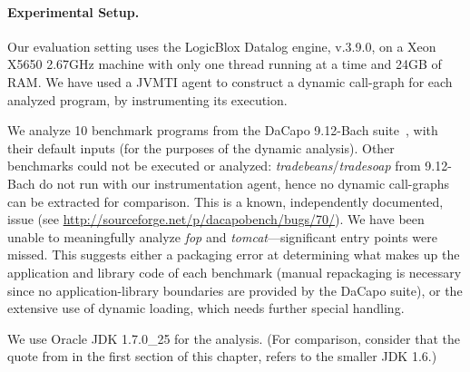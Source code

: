 \paragraph{Experimental Setup.}
Our evaluation setting uses the LogicBlox Datalog engine, v.3.9.0, on
a Xeon X5650 2.67GHz machine with only one thread running at a time
and 24GB of RAM. We have used a JVMTI agent to construct a dynamic
call-graph for each analyzed program, by instrumenting its execution.

We analyze 10 benchmark programs from the DaCapo 9.12-Bach
suite~\cite{dacapo:paper}, with their default inputs (for the purposes
of the dynamic analysis). Other benchmarks could not be executed or
analyzed: \emph{tradebeans}/\emph{tradesoap} from 9.12-Bach do not run
with our instrumentation agent, hence no dynamic call-graphs can be
extracted for comparison. This is a known, independently documented,
issue (see {\small
  \url{http://sourceforge.net/p/dacapobench/bugs/70/}}). We have been
unable to meaningfully analyze \emph{fop} and
\emph{tomcat}---significant entry points were missed. This suggests
either a packaging error at determining what makes up the application
and library code of each benchmark (manual repackaging is necessary
since no application-library boundaries are provided by the DaCapo
suite), or the extensive use of dynamic loading, which needs further
special handling.

We use Oracle JDK 1.7.0\_25 for the analysis.  
(For comparison, consider that the quote from
\cite{www:wala-reflection} in the first section of this chapter,
refers to the smaller JDK 1.6.)



 


